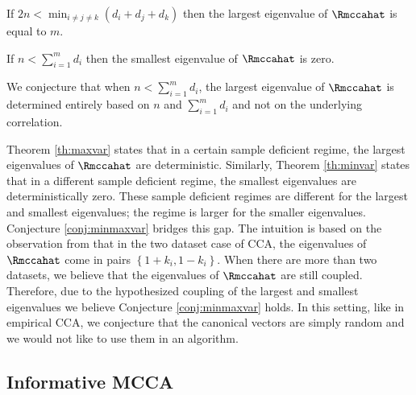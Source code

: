 \begin{Th}\label{th:maxvar}
If $2n<\min_{i\neq j\neq k}(d_i+d_j+d_k)$ then the largest eigenvalue of $\Rmccahat$ is equal
to $m$. 
\end{Th}

\begin{Th}\label{th:minvar}
If $n<\sum_{i=1}^md_i$ then the smallest eigenvalue of $\Rmccahat$ is zero.
\end{Th}

\begin{Conj}\label{conj:minmaxvar}
We conjecture that when $n<\sum_{i=1}^md_i$, the largest eigenvalue of $\Rmccahat$ is
determined entirely based on $n$ and $\sum_{i=1}^md_i$ and not on the underlying
correlation.
\end{Conj}

Theorem \ref{th:maxvar} states that in a certain sample deficient regime, the largest
eigenvalues of $\Rmccahat$ are deterministic. Similarly, Theorem \ref{th:minvar} states that
in a different sample deficient regime, the smallest eigenvalues are deterministically
zero. These sample deficient regimes are different for the largest and smallest
eigenvalues; the regime is larger for the smaller eigenvalues. Conjecture
\ref{conj:minmaxvar} bridges this gap. The intuition is based on the observation from
\cite{bach2003kernel} that in the two dataset case of CCA, the eigenvalues of $\Rmccahat$ come in pairs $\left\{1+k_i,1-k_i\right\}$. When there are more than two datasets, we believe that the
eigenvalues of $\Rmccahat$ are still coupled. Therefore, due to the hypothesized coupling of the largest and smallest
eigenvalues we believe Conjecture \ref{conj:minmaxvar} holds. In this setting, like in
empirical CCA, we conjecture that the canonical vectors are simply random and we would not
like to use them in an algorithm.

\subsection{Informative MCCA}

